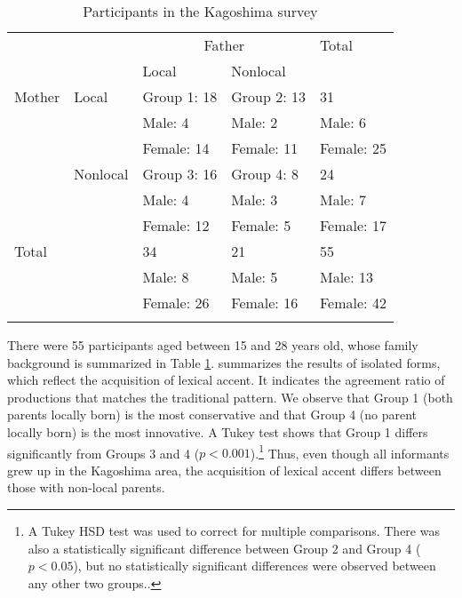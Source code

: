 \documentclass[output=paper,colorlinks,citecolor=brown]{langscibook}
\begin{document}
\begin{table}[p]
\caption{Participants in the Kagoshima survey}
\label{tab:kagpart}
\begin{tabular}{lllll}
\lsptoprule
                        &                            & \multicolumn{2}{c}{Father} & Total      \\\cmidrule(lr){3-4}
                        &                            & Local        & Nonlocal   &            \\\midrule
                 Mother & Local                      & Group 1: 18  & Group 2: 13 & 31         \\
                        &                            & Male: 4      & Male: 2     & Male: 6    \\
                        &                            & Female: 14   & Female: 11  & Female: 25 \\\cmidrule(lr){2-5}
                        &                   Nonlocal & Group 3: 16  & Group 4: 8  & 24         \\
                        &                            & Male: 4      & Male: 3     & Male: 7    \\
                        &                            & Female: 12   & Female: 5   & Female: 17 \\\midrule
                 Total  &                            & 34           & 21          & 55         \\
                        &                            & Male: 8      & Male: 5     & Male: 13   \\
                        &                            & Female: 26   & Female: 16  & Female: 42 \\
\lspbottomrule
\end{tabular}
\end{table}

There were 55 participants aged between 15 and 28 years old, whose family background is summarized in Table \ref{tab:kagpart}.  summarizes the results of isolated forms, which reflect the acquisition of lexical accent. It indicates the agreement ratio of productions that matches the traditional pattern. We observe that Group 1 (both parents locally born) is the most conservative and that Group 4 (no parent locally born) is the most innovative. A Tukey test shows that Group 1 differs significantly from Groups 3 and 4 ($p < 0.001$).\footnote{A Tukey HSD test was used to correct for multiple comparisons. There was also a statistically significant difference between Group 2 and Group 4 ($p < 0.05$), but no statistically significant differences were observed between any other two groups..} Thus, even though all informants grew up in the Kagoshima area, the acquisition of lexical accent differs between those with non-local parents.
\end{document}
